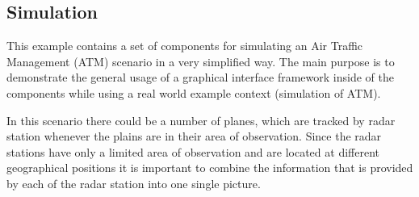 \documentclass[12pt,a4paper]{report}
\begin{document}
\subsection{Simulation}
\label{sec:Simulation}
This example contains a set of components for simulating an Air Traffic Management (ATM) scenario in a very simplified way. The main purpose is to demonstrate the general usage of a graphical interface framework inside of the components while using a real world example context (simulation of ATM). 

In this scenario there could be a number of planes, which are tracked by radar station whenever the plains are in their area of observation. Since the radar stations have only a limited area of observation and are located at different geographical positions it is important to combine the information that is provided by each of the radar station into one single picture.
\end{document}
